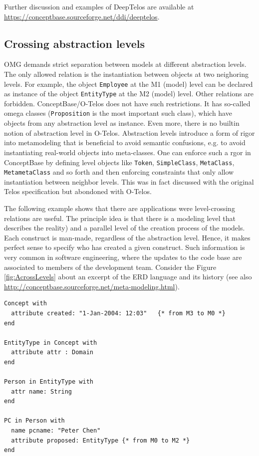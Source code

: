 Further discussion and examples of DeepTelos are available at \url{https://conceptbase.sourceforge.net/ddi/deeptelos}.



\subsection{Crossing abstraction levels} \label{sec:crosslev}

OMG demands strict separation between models at different abstraction levels. 
The only allowed relation is the instantiation between objects at two neighoring
levels. For example, the object {\tt Employee} at the M1 (model) level can
be declared as instance of the  object {\tt EntityType} at the M2 (model) level.
Other relations are forbidden. ConceptBase/O-Telos does not have such restrictions. It has
so-called omega classes ({\tt Proposition} is the most important such class),
which have objects from any abstraction level as instance. Even more, there is no 
builtin notion of abstraction level in O-Telos. Abstraction levels introduce a form
of rigor into metamodeling that is beneficial to avoid semantic confusions, e.g.
to avoid instantiating real-world objects into meta-classes. One can enforce such
a rgor in ConceptBase by defining level objects like {\tt Token}, {\tt SimpleClass},
{\tt MetaClass}, {\tt MetametaClass} and so forth and then enforcing constraints that 
only allow instantiation between neighbor levels. This was in fact discussed with the
original Telos specification but abondoned with O-Telos.


The following example shows that there are applications were level-crossing
relations are useful. The principle idea is that there is a modeling level
that describes the reality) and a parallel level of the creation process of
the models. Each construct is man-made, regardless of the abstraction level. Hence,
it makes perfect sense to specify who has created a given construct. Such information
is very common in software engineering, where the updates to the code base are
associated to members of the development team. Consider the  Figure \ref{fig:AcrossLevels}
about an excerpt of the ERD language and its history (see also 
\url{http://conceptbase.sourceforge.net/meta-modeling.html}).

{\small
\begin{verbatim}
Concept with
  attribute created: "1-Jan-2004: 12:03"   {* from M3 to M0 *}
end

EntityType in Concept with  
  attribute attr : Domain
end 

Person in EntityType with
  attr name: String
end

PC in Person with
  name pcname: "Peter Chen"
  attribute proposed: EntityType {* from M0 to M2 *}
end
\end{verbatim}
}

